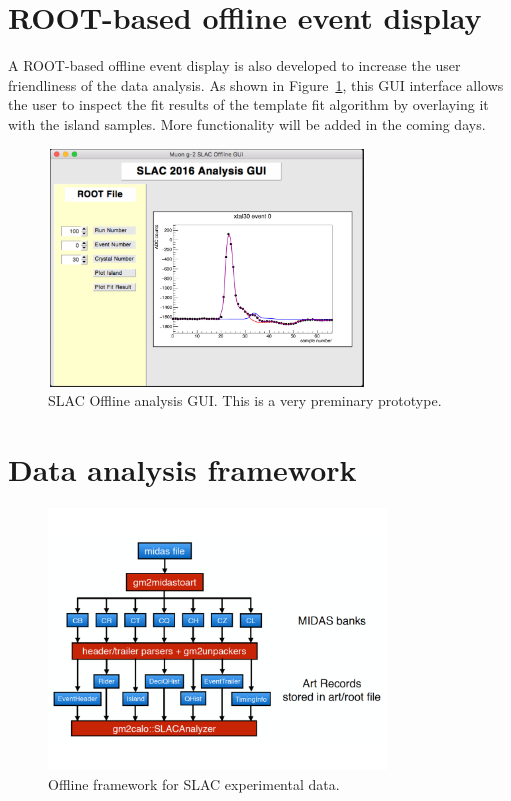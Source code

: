 \documentclass[12pt,letterpaper]{article}
\begin{document}
\section{ROOT-based offline event display}

A ROOT-based offline event display is also developed to increase the user friendliness of the data analysis. As shown in Figure~\ref{fig:GUI}, this GUI interface allows the user to inspect the fit results of the template fit algorithm by overlaying it with the island samples.
More functionality will be added in the coming days.

\begin{figure}[htbp]
\centering
\includegraphics[width=0.75\textwidth]{pics/SLAC2016_Analysis_GUI}
\caption{SLAC Offline analysis GUI. This is a very preminary prototype.}\label{fig:GUI}
\end{figure}


\newpage
\appendix

\section{Data analysis framework}

\begin{figure}[htbp]
\centering
\includegraphics[width=0.8\textwidth]{pics/offline_slac_framework}
\caption{Offline framework for SLAC experimental data.}
\end{figure}
\end{document}
